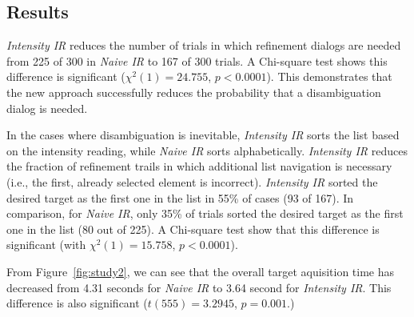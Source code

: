 






\subsection{Results}
{\em Intensity IR} reduces the number of trials in which refinement dialogs are needed from 225 of 300 in {\em Naive IR} to 167 of 300 trials. A Chi-square test shows this difference is significant ($\chi^2(1) = 24.755$, $p < 0.0001$). This demonstrates that the new approach successfully reduces the probability that a disambiguation dialog is needed.

In the cases where disambiguation is inevitable, {\em Intensity IR} sorts the list based on the intensity reading, while {\em Naive IR} sorts alphabetically. {\em Intensity IR} reduces the fraction of refinement trails in which additional list navigation is necessary (i.e., the first, already selected element is incorrect).  {\em Intensity IR} sorted the desired target as the first one in the list in 55\% of cases (93 of 167). In comparison, for {\em Naive IR}, only 35\% of trials sorted the desired target as the first one in the list (80 out of 225). A Chi-square test show that this difference is significant (with $\chi^2(1) = 15.758$, $p < 0.0001$).

From Figure~\ref{fig:study2}, we can see that the overall target aquisition time has decreased from 4.31 seconds for {\em Naive IR} to 3.64 second for {\em Intensity IR}. This difference is also significant ($t(555)=3.2945$, $p=0.001$.) 




